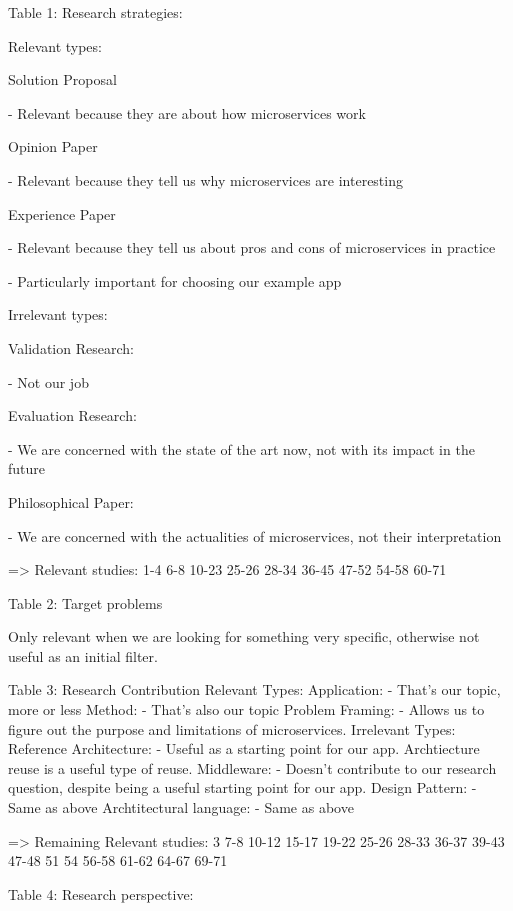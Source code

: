 \documentclass{article}
\begin{document}
Table 1: Research strategies:

Relevant types:

    Solution Proposal

     - Relevant because they are about how microservices work

    Opinion Paper

    - Relevant because they tell us why microservices are interesting

    Experience Paper

    - Relevant because they tell us about pros and cons of microservices in practice

    - Particularly important for choosing our example app

Irrelevant types:

    Validation Research:

    - Not our job

    Evaluation Research:

    - We are concerned with the state of the art now, not with its impact in the future

    Philosophical Paper:

    - We are concerned with the actualities of microservices, not their interpretation


=> Relevant studies:
    1-4
    6-8
    10-23
    25-26
    28-34
    36-45
    47-52
    54-58
    60-71
    
Table 2: Target problems

    Only relevant when we are looking for something very specific, otherwise not useful as an initial filter.


Table 3: Research Contribution
Relevant Types:
    Application:
        - That's our topic, more or less
    Method:
        - That's also our topic
    Problem Framing:
        - Allows us to figure out the purpose and limitations of microservices.
Irrelevant Types:
    Reference Architecture:
        - Useful as a starting point for our app. Archtiecture reuse is a useful type of reuse.
    Middleware:
        - Doesn't contribute to our research question, despite being a useful starting point for our app.
    Design Pattern:
        - Same as above
    Archtitectural language:
        - Same as above
 
=> Remaining Relevant studies:
    3
    7-8
    10-12
    15-17
    19-22
    25-26
    28-33
    36-37
    39-43
    47-48
    51
    54
    56-58
    61-62
    64-67
    69-71
    
Table 4: Research perspective:
\end{document}
